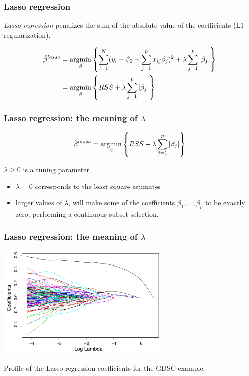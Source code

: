 \documentclass[notes]{beamer}          %
\newcommand{\argmin}{\operatornamewithlimits{argmin}}
\begin{document}
\begin{frame}
\frametitle{Lasso regression}
\textit{Lasso regression} penalizes the sum of the absolute value of the coefficients (L1 regularization). 

\begin{align*}
\hat{\beta}^{lasso} &= \argmin_{\beta} \left\{ \sum_{i=1}^N (y_i - \beta_0 -  \sum_{j=1}^p x_{ij}\beta_j)^2 + \lambda \sum_{j=1}^p | \beta_j | \right\} \\
& =  \argmin_{\beta} \left\{ RSS + \lambda \sum_{j=1}^p | \beta_j | \right\}
\end{align*}

\end{frame}


\begin{frame}
\frametitle{Lasso regression: the meaning of $\lambda$}

\begin{equation*}
    \hat{\beta}^{lasso} =  \argmin_{\beta} \left\{ RSS + \lambda \sum_{j=1}^p | \beta_j | \right\}
\end{equation*}

$\lambda \geq 0$ is a tuning parameter.

\begin{itemize}
    \item $\lambda = 0$ corresponds to the least square estimates
    \item larger values of $\lambda$, will make some of the coefficients $\beta_1, \dots, \beta_p$ to be exactly zero, performing a continuous subset selection.
\end{itemize}
\end{frame}

\begin{frame}
\frametitle{Lasso regression: the meaning of $\lambda$}

\begin{center}
\includegraphics[height=5.5cm]{../figures/week_2_linear_models/Lasso_regression_coefficinets.pdf}
\end{center}

Profile of the Lasso regression coefficients for the GDSC example.

\end{frame}
\end{document}
